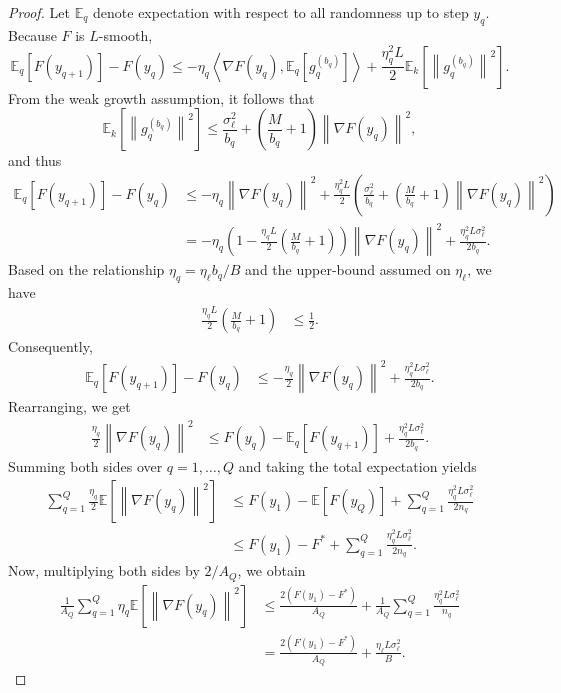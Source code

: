 \documentclass[twoside]{article}
\newcommand{\norm}[1]{\left\lVert#1\right\rVert}
\begin{document}
\newcommand{\ip}[2]{\left\langle #1, #2 \right\rangle}
\begin{proof}
Let $\mathbb{E}_q$ denote expectation with respect to all randomness up to step $y_q$. Because $F$ is $L$-smooth,
\[
\mathbb{E}_q[F(y_{q+1})] - F(y_q) \le - \eta_q \ip{ \nabla F(y_q) }{ \mathbb{E}_q[g_q^{(b_q)}] } + \frac{\eta_q^2 L}{2} \mathbb{E}_k[ \norm{g_q^{(b_q)}}^2].
\]
From the weak growth assumption, it follows that
\[
\mathbb{E}_k[\norm{g_q^{(b_q)}}^2] \le \frac{\sigma_\ell^2}{b_q} + \left(\frac{M}{b_q} + 1\right) \norm{\nabla F(y_q)}^2,
\]
and thus
\begin{align*}
\mathbb{E}_q[F(y_{q+1})] - F(y_q) &\le - \eta_q \norm{ \nabla F(y_q) }^2 + \frac{\eta_q^2 L}{2} \left( \frac{\sigma_\ell^2}{b_q} + \left(\frac{M}{b_q} + 1\right) \norm{\nabla F(y_q)}^2 \right) \\
&= - \eta_q \left(1 - \frac{\eta_q L}{2} \left(\frac{M}{b_q} + 1\right)\right) \norm{\nabla F(y_q)}^2 + \frac{\eta_q^2 L \sigma_\ell^2}{2 b_q}.
\end{align*}
Based on the relationship $\eta_q = \eta_\ell b_q / B$ and the upper-bound assumed on $\eta_\ell$, we have
\begin{align*}
\frac{\eta_q L }{2} \left( \frac{M}{b_q} + 1\right) &\le \frac{1}{2}.
\end{align*}
Consequently,
\begin{align*}
\mathbb{E}_q[F(y_{q+1})] - F(y_q) &\le - \frac{\eta_q}{2} \norm{\nabla F(y_q)}^2 + \frac{\eta_q^2 L \sigma_\ell^2}{2 b_q}.
\end{align*}
Rearranging, we get
\begin{align*}
\frac{\eta_q}{2} \norm{\nabla F(y_q)}^2 &\le F(y_q) - \mathbb{E}_q[F(y_{q+1})] + \frac{\eta_q^2 L \sigma_\ell^2}{2 b_q}.
\end{align*}
Summing both sides over $q=1,\dots,Q$ and taking the total expectation yields
\begin{align*}
\sum_{q=1}^Q \frac{\eta_q}{2} \mathbb{E}[\norm{\nabla F(y_q)}^2] &\le F(y_1) - \mathbb{E}[F(y_Q)] + \sum_{q=1}^Q \frac{\eta_q^2 L \sigma_\ell^2}{2 n_q} \\
&\le F(y_1) - F^* + \sum_{q=1}^Q \frac{\eta_q^2 L \sigma_\ell^2}{2 n_q}.
\end{align*}
Now, multiplying both sides by $2/A_Q$, we obtain
\begin{align*}
\frac{1}{A_Q} \sum_{q=1}^Q \eta_q \mathbb{E}[\norm{\nabla F(y_q)}^2] &\le \frac{2(F(y_1) - F^*)}{A_Q} + \frac{1}{A_Q} \sum_{q=1}^Q \frac{\eta_q^2 L \sigma_\ell^2}{n_q} \\
&= \frac{2(F(y_1) - F^*)}{A_Q} + \frac{\eta_\ell L \sigma_\ell^2}{B}.
\end{align*}
\end{proof}
\end{document}
